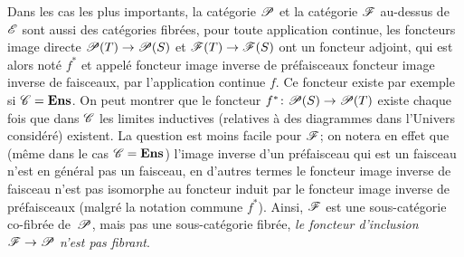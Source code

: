 \begin{enumerate}
Dans les cas les plus importants, la cat\'egorie $\cal{P}$ et la
cat\'egorie $\cal{F}$ au-dessus de~$\cal{E}$ sont aussi des
cat\'egories fibr\'ees, \ie pour toute application continue, les
foncteurs image directe $\cal{P}(T)\to \cal{P}(S)$ et
$\cal{F}(T)\to\cal{F}(S)$ ont un foncteur adjoint, qui est alors
not\'e $f^*$ et appel\'e foncteur image inverse de
pr\'efaisceaux \resp foncteur image inverse de faisceaux, par
l'application continue $f$. Ce foncteur existe par exemple si
$\cal{C}=\Ens$. On peut montrer que le foncteur $f^*\colon
\cal{P}(S)\to \cal{P}(T)$ existe chaque fois que dans $\cal{C}$ les
limites inductives (relatives \`a des diagrammes dans l'Univers
consid\'er\'e) existent. La question est moins facile pour
$\cal{F}$; on notera en effet que (m\^eme dans le cas
$\cal{C}=\Ens$) l'image inverse d'un pr\'efaisceau qui est un
faisceau n'est en g\'en\'eral pas un faisceau, en d'autres termes le
foncteur image inverse de faisceau n'est pas isomorphe au foncteur
induit par le foncteur image inverse de pr\'efaisceaux (malgr\'e
la notation commune $f^*$). Ainsi, $\cal{F}$ est une
sous-cat\'egorie co-fibr\'ee de~$\cal{P}$, mais pas une
sous-cat\'egorie fibr\'ee, \ie \emph{le foncteur d'inclusion
$\cal{F}\to\cal{P}$ n'est pas fibrant}.


\end{enumerate}
